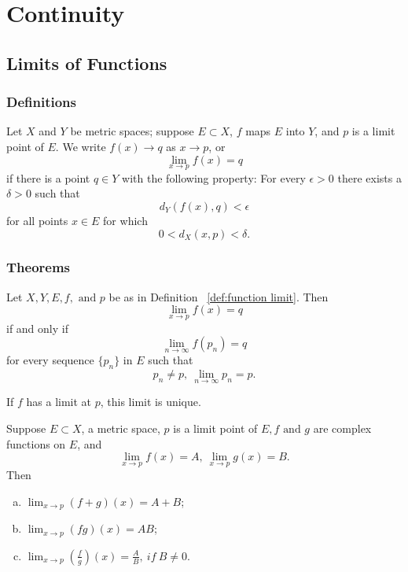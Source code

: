 \chapter{Continuity}

\section{Limits of Functions}
\subsection{Definitions}
\begin{definition}\label{def:function limit}
Let $X$ and $Y$ be metric spaces; suppose $E \subset X$, $f$ maps $E$ into $Y$, and $p$ is a limit point of $E$.  We write $f(x) \to q$ as $x \to p$, or $$\lim_{x \to p} f(x) = q$$ if there is a point $q \in Y$ with the following property: For every $\epsilon > 0$ there exists a $\delta > 0$ such that $$d_Y(f(x),q) < \epsilon$$ for all points $x \in E$ for which $$0 < d_X(x,p) < \delta.$$
\end{definition}

\subsection{Theorems}
\begin{theorem}
	Let $X, Y, E, f, \mbox{ and } p$ be as in Definition ~\ref{def:function limit}. Then $$\lim_{x \to p} f(x) = q$$ if and only if $$\lim_{n \to \infty} f(p_n) = q$$ for every sequence $\{p_n\}$ in $E$ such that $$p_n \ne p, ~\lim_{n \to \infty}p_n = p.$$
\end{theorem}

\begin{corollary}
	If $f$ has a limit at $p$, this limit is unique.
\end{corollary}

\begin{theorem}
	Suppose $E \subset X$, a metric space, $p$ is a limit point of $E, f \mbox{ and } g$ are complex functions on $E$, and $$\lim_{x \to p}f(x) = A, ~ \lim_{x \to p} g(x) = B.$$ Then
	\begin{enumerate}[(a)]
		\item $\lim_{x \to p} (f+g)(x) = A + B$;
		\item $\lim_{x \to p} (fg)(x) = AB$;
		\item $\lim_{x \to p} (\frac{f}{g})(x) = \frac{A}{B}, ~ if ~ B \ne 0$.
	\end{enumerate}
\end{theorem}

